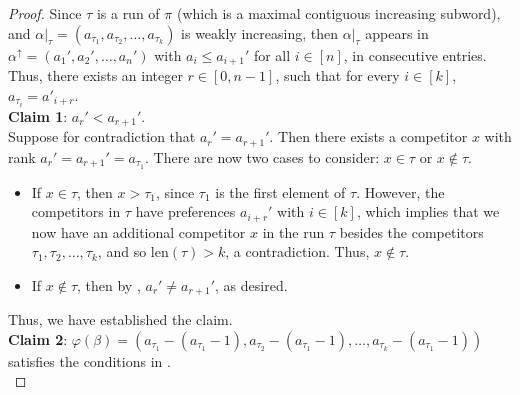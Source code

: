 \documentclass{amsart}
\theoremstyle{definition}
\theoremstyle{definition}
\theoremstyle{remark}
\newcommand{\len}{\mathrm{len}}
\begin{document}
\begin{proof}
    Since $\tau$ is a run of $\pi$ (which is a maximal contiguous increasing subword), and $\alpha|_{\tau}=(a_{\tau_1}, a_{\tau_2}, \ldots , a_{\tau_k})$ is weakly increasing, 
    then $\alpha|_{\tau}$ appears in $\alpha^{\uparrow}=(a_1',a_2',\ldots,a_n')$ with $a_i\leq a_{i+1}'$ for all $i\in[n]$, in consecutive entries. 
    Thus, there exists an integer $r \in [0,n-1]$, such that for every $i \in [k]$, $a_{\tau_i} = a'_{i+r}$. \\
    
    \noindent \textbf{Claim 1}:   $a_{r}'<a_{r+1}'$.\\
    
    Suppose for contradiction that $a_r'=a_{r+1}'$. 
    Then there exists a competitor $x$ with rank $a_{r}'=a_{r+1}'=a_{\tau_1}$. 
    There are now two cases to consider: $x\in\tau$ or $x\notin\tau$. 
    \begin{itemize}
    \item If $x\in\tau$, then $x>\tau_1$, since $\tau_1$ is the first element of $\tau$.
However, the competitors in $\tau$ have preferences $a_{i+r}'$ with $i\in[k]$, which implies that we now have an additional competitor $x$ in the run $\tau$ besides the competitors $\tau_1,\tau_2,\ldots,\tau_k$, and so $\len(\tau)>k$, a contradiction. Thus, $x\notin\tau$. 
\item If $x\notin\tau$, then by , $a_{r}'\neq a_{r+1}'$, as desired.
    \end{itemize}
    Thus, we have established the claim.\\

\noindent \textbf{Claim 2}: $\varphi(\beta)=(a_{\tau_1}-(a_{\tau_1}-1),a_{\tau_2}-(a_{\tau_1}-1),\ldots,a_{\tau_k}-(a_{\tau_1}-1))$ satisfies the conditions in . \\


\end{proof}
\end{document}
